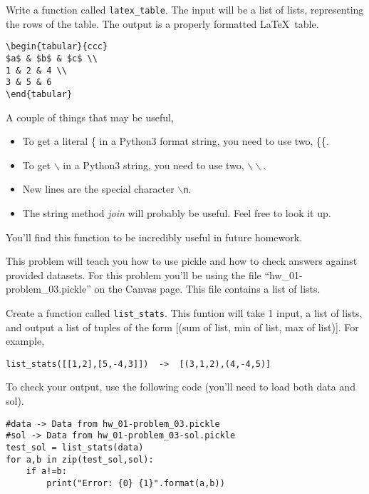 \documentclass[11pt,letterpaper]{article}
\begin{document}
\begin{problem}
 Write a function called \texttt{latex\_table}. The input will be a list of lists, representing the rows
of the table. The output is a properly formatted \LaTeX\ table. 
\begin{verbatim}
\begin{tabular}{ccc}
$a$ & $b$ & $c$ \\
1 & 2 & 4 \\
3 & 5 & 6
\end{tabular}
\end{verbatim}
A couple of things that may be useful,
\begin{itemize}
 \item To get a literal \{ in a Python3 format string, you need to use two, \{\{.
 \item To get $\backslash$ in a Python3 string, you need to use two, $\backslash\backslash$.
 \item New lines are the special character \texttt{$\backslash$n}.
 \item The string method \emph{join} will probably be useful. Feel free to look it up.
\end{itemize}
You'll find this function to be incredibly useful in future homework.
\end{problem}


\begin{problem}
This problem will teach you how to use pickle and how to check answers against provided datasets. For this problem you'll be using the file ``hw\_01-problem\_03.pickle'' on the Canvas page. This file contains a list of lists.

Create a function called \texttt{list\_stats}. This funtion will take 1 input, a list of lists, and output a list of tuples of the form [(sum of list, min of list, max of list)]. For example, 
\begin{verbatim}
list_stats([[1,2],[5,-4,3]])  ->  [(3,1,2),(4,-4,5)]
\end{verbatim}

To check your output, use the following code (you'll need to load both data and sol). 

\begin{verbatim}
#data -> Data from hw_01-problem_03.pickle
#sol -> Data from hw_01-problem_03-sol.pickle
test_sol = list_stats(data)
for a,b in zip(test_sol,sol):
    if a!=b:
        print("Error: {0} {1}".format(a,b))
\end{verbatim}


\end{problem}
\end{document}
